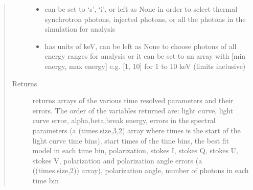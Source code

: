 \documentclass[letterpaper,10pt,english]{sphinxmanual}
\begin{document}
\begin{fulllineitems}
\begin{quote}
\begin{description}
\begin{itemize}
\item {} 
 \textendash{} can be set to ‘s’, ‘i’, or left as None in order to select thermal synchrotron photons, injected photons, or all the photons in the simulation for analysis

\item {} 
 \textendash{} has units of keV, can be left as None to choose photons of all energy ranges for analysis or it can be set to an array with {[}min energy, max energy{]} e.g. {[}1, 10{]} for 1 to 10 keV (limits inclusive)

\end{itemize}

\item[{Returns}] \leavevmode
returns arrays of the various time resolved parameters and their errors. The order of the variables
returned are: light curve, light curve error, alpha,beta,break energy, errors in the spectral parameters
(a (times.size,3,2) array where times is the start of the light curve time bins), start times of the time bins, the best fit model in each time bin,
polarization, stokes I, stokes Q, stokes U, stokes V, polarization and polarization angle errors (a ((times.size,2)) array), polarization angle,
number of photons in each time bin

\end{description}\end{quote}

\end{fulllineitems}

\end{document}
